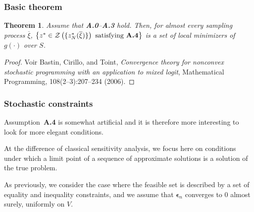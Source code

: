 \documentclass{beamer}
\newtheorem{theo}{Theorem}
\def\bepsilon{\boldsymbol\epsilon}
\begin{document}
\begin{frame}
\frametitle{Basic theorem}

\begin{theo}
\label{th:basic_second_order}
Assume that \textbf{A.0}--\textbf{A.3} hold.
Then, for almost every sampling process $\overline{\xi}$,
$\left \lbrace z^* \in \mathcal{Z}\left(\lbrace
    z^*_N(\overline{\xi})\rbrace\right) \text{ satisfying
    \textbf{A.4}} \right \rbrace$ is a set of local minimizers of $g(\cdot)$ over $S$.
\end{theo}

\begin{proof}
Voir Bastin, Cirillo, and Toint, {\sl Convergence theory for
  nonconvex stochastic programming with an application to mixed logit},
  Mathematical Programming, 108(2--3):207--234 (2006).
\end{proof}

\end{frame}

\begin{frame}
\frametitle{Stochastic constraints}

Assumption~\textbf{A.4} is somewhat artificial and it is therefore more interesting  to look for more elegant conditions.

\mbox{}

At the difference of classical sensitivity analysis, we focus here on conditions under which a limit point of a sequence of approximate solutions is a solution of the true problem.

\mbox{}

As previously, we consider the case where the feasible set is described by a set of equality and inequality constraints, and we assume that $\bepsilon_n$ converges to 0 almost surely, uniformly on $V$.

\end{frame}
\end{document}
